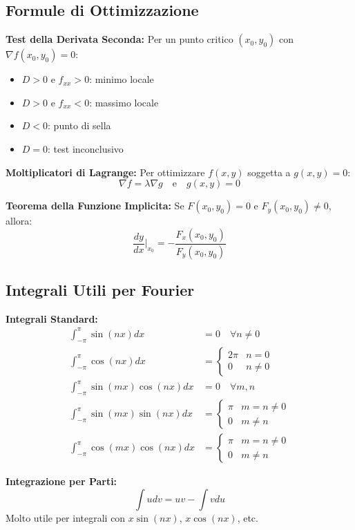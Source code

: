 \subsection{Formule di Ottimizzazione}

\begin{info}
\textbf{Test della Derivata Seconda:}
Per un punto critico $(x_0, y_0)$ con $\nabla f(x_0, y_0) = 0$:
\begin{itemize}
    \item $D > 0$ e $f_{xx} > 0$: minimo locale
    \item $D > 0$ e $f_{xx} < 0$: massimo locale  
    \item $D < 0$: punto di sella
    \item $D = 0$: test inconclusivo
\end{itemize}

\textbf{Moltiplicatori di Lagrange:}
Per ottimizzare $f(x,y)$ soggetta a $g(x,y) = 0$:
\[ \nabla f = \lambda \nabla g \quad \text{e} \quad g(x,y) = 0 \]

\textbf{Teorema della Funzione Implicita:}
Se $F(x_0, y_0) = 0$ e $F_y(x_0, y_0) \neq 0$, allora:
\[ \frac{dy}{dx}\bigg|_{x_0} = -\frac{F_x(x_0, y_0)}{F_y(x_0, y_0)} \]
\end{info}

\subsection{Integrali Utili per Fourier}

\begin{info}
\textbf{Integrali Standard:}
\begin{align}
\int_{-\pi}^{\pi} \sin(nx) dx &= 0 \quad \forall n \neq 0 \\
\int_{-\pi}^{\pi} \cos(nx) dx &= \begin{cases} 2\pi & n = 0 \\ 0 & n \neq 0 \end{cases} \\
\int_{-\pi}^{\pi} \sin(mx)\cos(nx) dx &= 0 \quad \forall m,n \\
\int_{-\pi}^{\pi} \sin(mx)\sin(nx) dx &= \begin{cases} \pi & m = n \neq 0 \\ 0 & m \neq n \end{cases} \\
\int_{-\pi}^{\pi} \cos(mx)\cos(nx) dx &= \begin{cases} \pi & m = n \neq 0 \\ 0 & m \neq n \end{cases}
\end{align}

\textbf{Integrazione per Parti:}
\[ \int u dv = uv - \int v du \]
Molto utile per integrali con $x \sin(nx)$, $x \cos(nx)$, etc.
\end{info}


